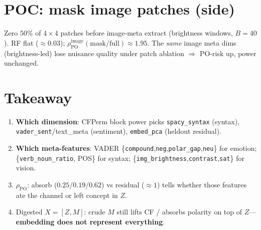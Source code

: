 \documentclass[11pt]{article}
\begin{document}
\section{POC: mask image patches (side)}
Zero $50\%$ of $4{\times}4$ patches before image-meta extract
(brightness windows, $B{=}40$). RF flat ($\approx 0.03$);
$\rho_{\mathrm{PO}}^{\mathrm{image}}(\mathrm{mask}/\mathrm{full})\approx 1.95$.
The \emph{same} image meta dims (brightness-led) lose nuisance quality
under patch ablation $\Rightarrow$ PO-risk up, power unchanged.

\section{Takeaway}
\begin{enumerate}[leftmargin=*]
  \item \textbf{Which dimension}: CFPerm block power picks
        \texttt{spacy\_syntax} (syntax), \texttt{vader\_sent}/text\_meta
        (sentiment), \texttt{embed\_pca} (heldout residual).
  \item \textbf{Which meta-features}: VADER
        \{\texttt{compound},\texttt{neg},\texttt{polar\_gap},\texttt{neu}\}
        for emotion; \{\texttt{verb\_noun\_ratio}, POS\} for syntax;
        \{\texttt{img\_brightness},\texttt{contrast},\texttt{sat}\} for
        vision.
  \item \textbf{$\rho_{\mathrm{PO}}$}: absorb ($0.25$/$0.19$/$0.62$) vs
        residual ($\approx 1$) tells whether those features ate the
        channel or left concept in $Z$.
  \item Digested $X{=}[Z,M]$: crude $M$ still lifts CF / absorbs polarity
        on top of $Z$---\textbf{embedding does not represent everything}.
\end{enumerate}
\end{document}
